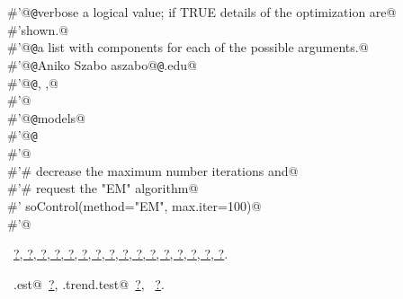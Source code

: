 \documentclass[reqno]{amsart}
\renewcommand{\NWlink}[2]{\hyperlink{#1}{#2}}
\begin{document}
\begin{flushleft}
\begin{list}{}{}
\mbox{}\verb@#'@{\tt @}\verb@param verbose a logical value; if TRUE details of the optimization are@\\
\mbox{}\verb@#'shown.@\\
\mbox{}\verb@#'@{\tt @}\verb@return a list with components for each of the possible arguments.@\\
\mbox{}\verb@#'@{\tt @}\verb@author Aniko Szabo aszabo@{\tt @}\verb@mcw.edu@\\
\mbox{}\verb@#'@{\tt @}\verb@seealso {}, ,@\\
\mbox{}\verb@#'@\\
\mbox{}\verb@#'@{\tt @}\verb@keywords models@\\
\mbox{}\verb@#'@{\tt @}\verb@examples@\\
\mbox{}\verb@#'@\\
\mbox{}\verb@#'# decrease the maximum number iterations and@\\
\mbox{}\verb@#'# request the "EM" algorithm@\\
\mbox{}\verb@#' soControl(method="EM", max.iter=100)@\\
\mbox{}\verb@#'@\\
\mbox{}\verb@@{\NWsep}
\end{list}
\vspace{-1.5ex}
\footnotesize
\begin{list}{}{\setlength{\itemsep}{-\parsep}\setlength{\itemindent}{-\leftmargin}}
\item \NWtxtFileDefBy\ \NWlink{nuweb?}{?}\NWlink{nuweb?}{, ?}\NWlink{nuweb?}{, ?}\NWlink{nuweb?}{, ?}\NWlink{nuweb?}{, ?}\NWlink{nuweb?}{, ?}\NWlink{nuweb?}{, ?}\NWlink{nuweb?}{, ?}\NWlink{nuweb?}{, ?}\NWlink{nuweb?}{, ?}\NWlink{nuweb?}{, ?}\NWlink{nuweb?}{, ?}\NWlink{nuweb?}{, ?}\NWlink{nuweb?}{, ?}\NWlink{nuweb?}{, ?}\NWlink{nuweb?}{, ?}.
\item \NWtxtIdentsUsed\nobreak\  \verb@mc.est@\nobreak\ \NWlink{nuweb?}{?}, \verb@SO.trend.test@\nobreak\ \NWlink{nuweb?}{?}, \verb@soControl@\nobreak\ \NWlink{nuweb?}{?}.
\item{}
\end{list}
\vspace{4ex}
\end{flushleft}
\end{document}
